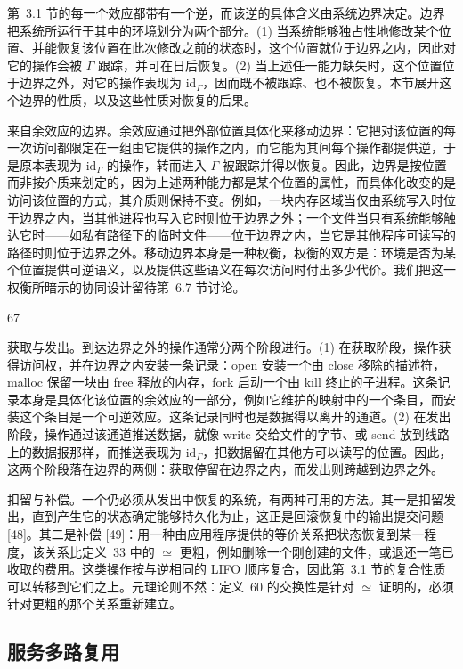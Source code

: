 \documentclass[
  10
]{article}
\begin{document}
第~3.1 节的每一个效应都带有一个逆，而该逆的具体含义由系统边界决定。边界把系统所运行于其中的环境划分为两个部分。(1) 当系统能够独占性地修改某个位置、并能恢复该位置在此次修改之前的状态时，这个位置就位于边界之内，因此对它的操作会被 $\Gamma$ 跟踪，并可在日后恢复。(2) 当上述任一能力缺失时，这个位置位于边界之外，对它的操作表现为 \(\mathrm { i d } _ { \Gamma }\)，因而既不被跟踪、也不被恢复。本节展开这个边界的性质，以及这些性质对恢复的后果。

来自余效应的边界。余效应通过把外部位置具体化来移动边界：它把对该位置的每一次访问都限定在一组由它提供的操作之内，而它能为其间每个操作都提供逆，于是原本表现为 \(\mathrm { i d } _ { \Gamma }\) 的操作，转而进入 $\Gamma$ 被跟踪并得以恢复。因此，边界是按位置而非按介质来划定的，因为上述两种能力都是某个位置的属性，而具体化改变的是访问该位置的方式，其介质则保持不变。例如，一块内存区域当仅由系统写入时位于边界之内，当其他进程也写入它时则位于边界之外；一个文件当只有系统能够触达它时——如私有路径下的临时文件——位于边界之内，当它是其他程序可读写的路径时则位于边界之外。移动边界本身是一种权衡，权衡的双方是：环境是否为某个位置提供可逆语义，以及提供这些语义在每次访问时付出多少代价。我们把这一权衡所暗示的协同设计留待第~6.7 节讨论。

67

获取与发出。到达边界之外的操作通常分两个阶段进行。(1) 在获取阶段，操作获得访问权，并在边界之内安装一条记录：open 安装一个由 close 移除的描述符，malloc 保留一块由 free 释放的内存，fork 启动一个由 kill 终止的子进程。这条记录本身是具体化该位置的余效应的一部分，例如它维护的映射中的一个条目，而安装这个条目是一个可逆效应。这条记录同时也是数据得以离开的通道。(2) 在发出阶段，操作通过该通道推送数据，就像 write 交给文件的字节、或 send 放到线路上的数据报那样，而推送表现为 \(\mathrm { i d } _ { \Gamma }\)，把数据留在其他方可以读写的位置。因此，这两个阶段落在边界的两侧：获取停留在边界之内，而发出则跨越到边界之外。

扣留与补偿。一个仍必须从发出中恢复的系统，有两种可用的方法。其一是扣留发出，直到产生它的状态确定能够持久化为止，这正是回滚恢复中的输出提交问题 {[}48{]}。其二是补偿 {[}49{]}：用一种由应用程序提供的等价关系把状态恢复到某一程度，该关系比定义~33 中的 $\simeq$ 更粗，例如删除一个刚创建的文件，或退还一笔已收取的费用。这类操作按与逆相同的 LIFO 顺序复合，因此第~3.1 节的复合性质可以转移到它们之上。元理论则不然：定义~60 的交换性是针对 $\simeq$ 证明的，必须针对更粗的那个关系重新建立。

\subsection{服务多路复用} \label{service-multiplexing}
\end{document}
